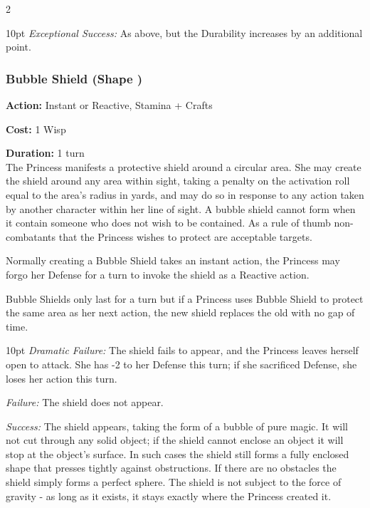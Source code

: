 \begin{multicols}{2}
\begin{myindentpar}{10pt}
\emph{Exceptional Success:} As above, but the Durability increases by an additional point.

\end{myindentpar}

\subsubsection*{Bubble Shield (Shape \textbullet)}

\noindent \textbf{Action:} Instant or Reactive, Stamina + Crafts

\noindent \textbf{Cost:} 1 Wisp

\noindent \textbf{Duration:} 1 turn \\

\noindent The Princess manifests a protective shield around a circular area. She may create the shield around any area within sight, taking a penalty on the activation roll equal to the area’s radius in yards, and may do so in
response to any action taken by another character within her line of sight. A bubble shield cannot form when it contain someone who does not wish to be contained. As a rule of thumb non-combatants that the Princess wishes to protect are acceptable targets. 

Normally creating a Bubble Shield takes an instant action, the Princess may forgo her Defense for a turn to invoke the shield as a Reactive action. 

Bubble Shields only last for a turn but if a Princess uses Bubble Shield to protect the same area as her next action, the new shield replaces the old with no gap of time.

\begin{myindentpar}{10pt}    \emph{Dramatic Failure:} The shield fails to appear, and the Princess leaves herself open to attack. She has -2 to her Defense this turn; if she sacrificed Defense, she loses her action this turn.

\emph{Failure:} The shield does not appear.

\emph{Success:} The shield appears, taking the form of a bubble of pure magic. It will not cut through any solid object; if the shield cannot enclose an object it will stop at the object’s surface. In such cases the shield still forms a fully enclosed shape that presses tightly against obstructions. If there are no obstacles the shield simply forms a perfect sphere. The shield is not subject to the force of gravity - as long as it exists, it stays exactly where the Princess created it.


\end{myindentpar}
\end{multicols}
